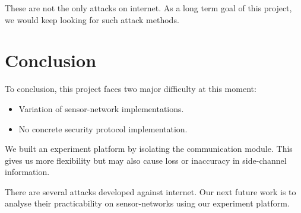 These are not the only attacks on internet. As a long term goal of this project, we would keep looking for such attack methods.

\section{Conclusion}

To conclusion, this project faces two major difficulty at this moment:
\begin{itemize}
\item Variation of sensor-network implementations.
\item No concrete security protocol implementation.
\end{itemize}

We built an experiment platform by isolating the communication module. This gives us more flexibility but may also cause loss or inaccuracy in side-channel information.

There are several attacks developed against internet. Our next future work is to analyse their practicability on sensor-networks using our experiment platform.